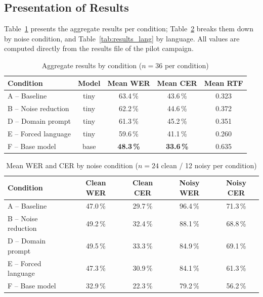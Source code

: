 \documentclass[12pt]{report}
\begin{document}
\subsection{Presentation of Results}
Table~\ref{tab:results_agg} presents the aggregate results per condition; Table~\ref{tab:results_noise} breaks them down by noise condition, and Table~\ref{tab:results_lang} by language. All values are computed directly from the results file of the pilot campaign.
\begin{table}[H]
\centering
\begin{tabular}{|l|c|c|c|c|}
\hline
\textbf{Condition} & \textbf{Model} & \textbf{Mean WER} & \textbf{Mean CER} & \textbf{Mean RTF} \\ \hline
A -- Baseline & tiny & 63.4\,\% & 43.6\,\% & 0.323 \\ \hline
B -- Noise reduction & tiny & 62.2\,\% & 44.6\,\% & 0.372 \\ \hline
D -- Domain prompt & tiny & 61.3\,\% & 45.2\,\% & 0.351 \\ \hline
E -- Forced language & tiny & 59.6\,\% & 41.1\,\% & 0.260 \\ \hline
F -- Base model & base & \textbf{48.3\,\%} & \textbf{33.6\,\%} & 0.635 \\ \hline
\end{tabular}
\caption{Aggregate results by condition ($n=36$ per condition)}
\label{tab:results_agg}
\end{table}
\begin{table}[H]
\centering
\begin{tabular}{|l|c|c|c|c|}
\hline
\textbf{Condition} & \textbf{Clean WER} & \textbf{Clean CER} & \textbf{Noisy WER} & \textbf{Noisy CER} \\ \hline
A -- Baseline & 47.0\,\% & 29.7\,\% & 96.4\,\% & 71.3\,\% \\ \hline
B -- Noise reduction & 49.2\,\% & 32.4\,\% & 88.1\,\% & 68.8\,\% \\ \hline
D -- Domain prompt & 49.5\,\% & 33.3\,\% & 84.9\,\% & 69.1\,\% \\ \hline
E -- Forced language & 47.3\,\% & 30.9\,\% & 84.1\,\% & 61.3\,\% \\ \hline
F -- Base model & 32.9\,\% & 22.3\,\% & 79.2\,\% & 56.2\,\% \\ \hline
\end{tabular}
\caption{Mean WER and CER by noise condition ($n=24$ clean / 12 noisy per condition)}
\label{tab:results_noise}
\end{table}
\end{document}
